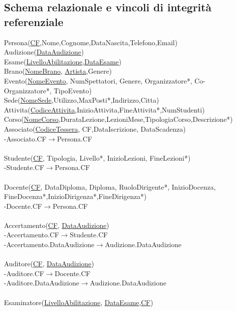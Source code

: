 \documentclass[11pt]{article}
\begin{document}
	\subsection{Schema relazionale e vincoli di integrità referenziale}
		Persona(\underline{CF},Nome,Cognome,DataNascita,Telefono,Email)\\
		Audizione(\underline{DataAudizione})\\
		Esame(\underline{LivelloAbilitazione},\underline{DataEsame})\\
		Brano(\underline{NomeBrano}, \underline{Artista},Genere)\\
		Evento(\underline{NomeEvento}, NumSpettatori, Genere, Organizzatore*, Co-Organizzatore*, TipoEvento)\\
		Sede(\underline{NomeSede},Utilizzo,MaxPosti*,Indirizzo,Citta)\\
		Attivita(\underline{CodiceAttivita},InizioAttivita,FineAttivita*,NumStudenti)\\
		Corso(\underline{NomeCorso},DurataLezione,LezioniMese,TipologiaCorso,Descrizione*)\\
		Associato(\underline{CodiceTessera}, CF,DataIscrizione, DataScadenza)\\
		-Associato.CF$\rightarrow$Persona.CF\\\\
		Studente(\underline{CF}, Tipologia, Livello*, InizioLezioni, FineLezioni*)\\
		-Studente.CF$\rightarrow$Persona.CF\\\\
		Docente(\underline{CF}, DataDiploma, Diploma, RuoloDirigente*, InizioDocenza, FineDocenza*,InizioDirigenza*,FineDirigenza*)\\
		-Docente.CF$\rightarrow$Persona.CF\\\\
		Accertamento(\underline{CF}, \underline{DataAudizione})\\
		-Accertamento.CF$\rightarrow$Studente.CF\\
		-Accertamento.DataAudizione$\rightarrow$Audizione.DataAudizione\\\\
		Auditore(\underline{CF}, \underline{DataAudizione})\\
		-Auditore.CF$\rightarrow$Docente.CF\\
		-Auditore.DataAudizione$\rightarrow$Audizione.DataAudizione\\\\
		Esaminatore(\underline{LivelloAbilitazione}, \underline{DataEsame},\underline{CF})\\
\end{document}
